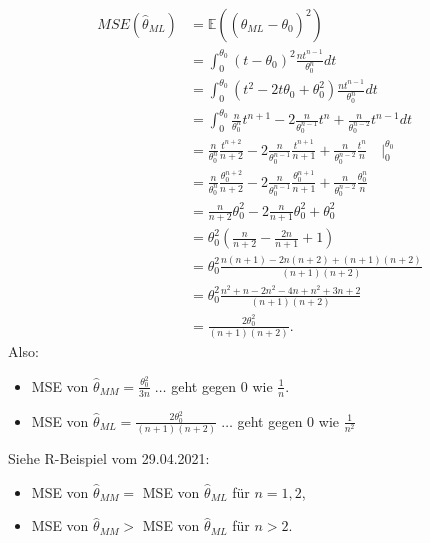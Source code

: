 \documentclass{tstextbook}
\newcommand{\E}{\mathbb E}
\begin{document}
\begin{example}
	\[
	\begin{aligned}
		MSE\left(\hat{\theta}_{ML}\right) & = \E\left(\left(\hat{\theta}_{ML} - \theta_0\right)^2\right) \\
		& = \int_{0}^{\theta_0} \left(t-\theta_0\right)^2 \frac{nt^{n-1}}{\theta_0^n} dt \\
		& = \int_{0}^{\theta_0} \left(t^2-2t\theta_0+\theta_0^2\right) \frac{nt^{n-1}}{\theta_0^n} dt \\
		& = \int_{0}^{\theta_0} \frac{n}{\theta_0^n} t^{n+1} - 2\frac{n}{\theta_0^{n-1}} t^n + \frac{n}{\theta_0^{n-2}} t^{n-1} dt \\
		& = \frac{n}{\theta_0^n} \frac{t^{n+2}}{n+2} - 2\frac{n}{\theta_0^{n-1}} \frac{t^{n+1}}{n+1} + \frac{n}{\theta_0^{n-2}} \frac{t^n}{n} \quad \Big|_0^{\theta_0} \\
		& = \frac{n}{\theta_0^n}\frac{\theta_0^{n+2}}{n+2} - 2\frac{n}{\theta_0^{n-1}} \frac{\theta_0^{n+1}}{n+1} + \frac{n}{\theta_0^{n-2}} \frac{\theta_0^n}{n} \\
		& = \frac{n}{n+2} \theta_0^2 - 2\frac{n}{n+1} \theta_0^2 + \theta_0^2 \\
		& = \theta_0^2 \left(\frac{n}{n+2}-\frac{2n}{n+1}+1\right) \\
		& = \theta_0^2 \frac{n(n+1)-2n(n+2)+(n+1)(n+2)}{(n+1)(n+2)} \\
		& = \theta_0^2 \frac{n^2+n-2n^2-4n+n^2+3n+2}{(n+1)(n+2)} \\
		& = \frac{2\theta_0^2}{(n+1)(n+2)}.
	\end{aligned}
	\]
Also: \begin{itemize}
	\item MSE von $ \hat{\theta}_{MM} = \frac{\theta_0^2}{3n}\; \ldots $ geht gegen $ 0 $ wie $ \frac{1}{n} $. 
	\item MSE von $ \hat{\theta}_{ML} = \frac{2\theta_0^2}{(n+1)(n+2)} \; \ldots $ geht gegen $ 0 $ wie $ \frac{1}{n^2} $
	\end{itemize}
	
	Siehe R-Beispiel vom 29.04.2021:
	\begin{itemize}
		\item MSE von $ \hat{\theta}_{MM} = $ MSE von $ \hat{\theta}_{ML} $ für $ n = 1, 2 $, 
		\item MSE von $ \hat{\theta}_{MM} > $ MSE von $ \hat{\theta}_{ML} $ für $ n > 2 $.
	\end{itemize}
	
\end{example}
\end{document}
